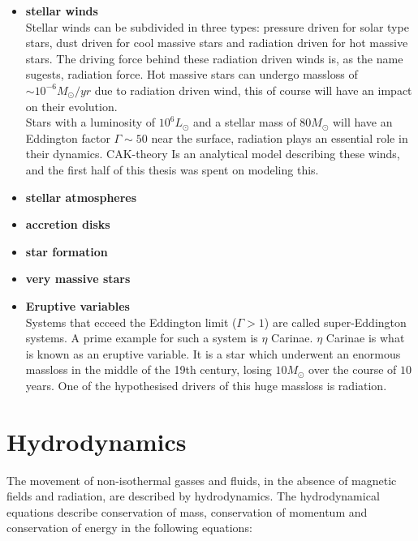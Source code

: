 \begin{itemize}
\item \textbf{stellar winds}\\
Stellar winds can be subdivided in three types: pressure driven for solar type stars, dust driven for cool massive stars and radiation driven for hot massive stars. The driving force behind these radiation driven winds is, as the name sugests, radiation force. Hot massive stars can undergo massloss of $\sim 10^{-6} M_\odot/yr$ due to radiation driven wind, this of course will have an impact on their evolution. \\
Stars with a luminosity of $10^6 L_\odot$ and a stellar mass of $80 M_\odot$ will have an Eddington factor $\Gamma \sim 50$ near the surface, radiation plays an essential role in their dynamics.
CAK-theory Is an analytical model describing these winds, and the first half of this thesis was spent on modeling this.\\

\item \textbf{stellar atmospheres}\\

\item \textbf{accretion disks}\\

\item \textbf{star formation}\\

\item \textbf{very massive stars}\\

\item \textbf{Eruptive variables}\\
Systems that ecceed the Eddington limit ($\Gamma > 1$) are called super-Eddington systems. A prime example for such a system is $\eta$ Carinae. $\eta$ Carinae is what is known as an eruptive variable. It is a star which underwent an enormous massloss in the middle of the 19th century, losing $10 M_\odot$ over the course of $10$ years. One of the hypothesised drivers of this huge massloss is radiation.
\end{itemize}




\section{Hydrodynamics}
The movement of non-isothermal gasses and fluids, in the absence of magnetic fields and radiation, are described by hydrodynamics. The hydrodynamical equations describe conservation of mass, conservation of momentum and conservation of energy in the following equations:

